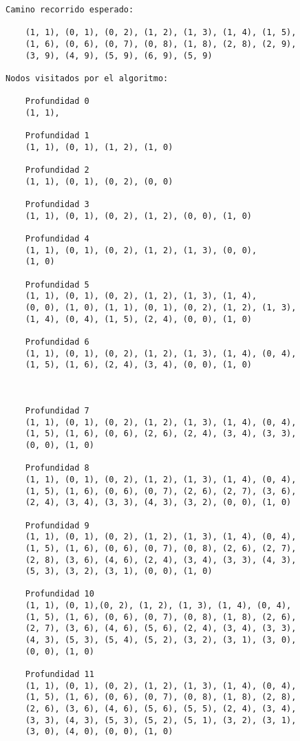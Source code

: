 \begin{lstlisting}[]
Camino recorrido esperado:

    (1, 1), (0, 1), (0, 2), (1, 2), (1, 3), (1, 4), (1, 5),
    (1, 6), (0, 6), (0, 7), (0, 8), (1, 8), (2, 8), (2, 9),
    (3, 9), (4, 9), (5, 9), (6, 9), (5, 9)

Nodos visitados por el algoritmo:

    Profundidad 0
    (1, 1), 
    
    Profundidad 1
    (1, 1), (0, 1), (1, 2), (1, 0) 
    
    Profundidad 2
    (1, 1), (0, 1), (0, 2), (0, 0)
    
    Profundidad 3
    (1, 1), (0, 1), (0, 2), (1, 2), (0, 0), (1, 0)
    
    Profundidad 4
    (1, 1), (0, 1), (0, 2), (1, 2), (1, 3), (0, 0),
    (1, 0)
    
    Profundidad 5
    (1, 1), (0, 1), (0, 2), (1, 2), (1, 3), (1, 4), 
    (0, 0), (1, 0), (1, 1), (0, 1), (0, 2), (1, 2), (1, 3),
    (1, 4), (0, 4), (1, 5), (2, 4), (0, 0), (1, 0) 
    
    Profundidad 6
    (1, 1), (0, 1), (0, 2), (1, 2), (1, 3), (1, 4), (0, 4),
    (1, 5), (1, 6), (2, 4), (3, 4), (0, 0), (1, 0) 



    Profundidad 7
    (1, 1), (0, 1), (0, 2), (1, 2), (1, 3), (1, 4), (0, 4), 
    (1, 5), (1, 6), (0, 6), (2, 6), (2, 4), (3, 4), (3, 3),
    (0, 0), (1, 0) 

    Profundidad 8
    (1, 1), (0, 1), (0, 2), (1, 2), (1, 3), (1, 4), (0, 4),
    (1, 5), (1, 6), (0, 6), (0, 7), (2, 6), (2, 7), (3, 6),
    (2, 4), (3, 4), (3, 3), (4, 3), (3, 2), (0, 0), (1, 0)

    Profundidad 9
    (1, 1), (0, 1), (0, 2), (1, 2), (1, 3), (1, 4), (0, 4),
    (1, 5), (1, 6), (0, 6), (0, 7), (0, 8), (2, 6), (2, 7),
    (2, 8), (3, 6), (4, 6), (2, 4), (3, 4), (3, 3), (4, 3),
    (5, 3), (3, 2), (3, 1), (0, 0), (1, 0) 

    Profundidad 10
    (1, 1), (0, 1),(0, 2), (1, 2), (1, 3), (1, 4), (0, 4), 
    (1, 5), (1, 6), (0, 6), (0, 7), (0, 8), (1, 8), (2, 6), 
    (2, 7), (3, 6), (4, 6), (5, 6), (2, 4), (3, 4), (3, 3), 
    (4, 3), (5, 3), (5, 4), (5, 2), (3, 2), (3, 1), (3, 0), 
    (0, 0), (1, 0) 

    Profundidad 11
    (1, 1), (0, 1), (0, 2), (1, 2), (1, 3), (1, 4), (0, 4),
    (1, 5), (1, 6), (0, 6), (0, 7), (0, 8), (1, 8), (2, 8), 
    (2, 6), (3, 6), (4, 6), (5, 6), (5, 5), (2, 4), (3, 4), 
    (3, 3), (4, 3), (5, 3), (5, 2), (5, 1), (3, 2), (3, 1), 
    (3, 0), (4, 0), (0, 0), (1, 0) 


\end{lstlisting}
